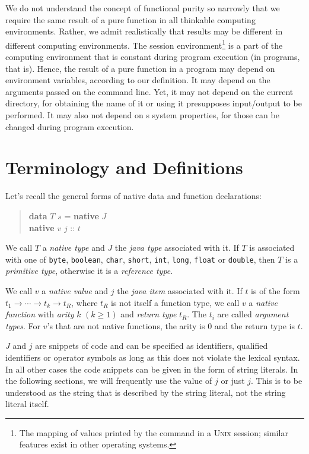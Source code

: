 \begin{description}
We do not understand the concept of functional purity so narrowly that we require the same result of a pure function in all thinkable computing environments. Rather, we admit realistically that results may be different in different computing environments. The session environment\footnote{The mapping of values printed by the command  in a \textsc{Unix} session; similar features exist in other operating systems.} is a part of the computing environment that is constant during program execution (in \java{} programs, that is). Hence, the result of a pure function in a program may depend on environment variables, according to our definition. It may depend on the arguments passed on the command line. Yet, it may not depend on the current directory, for obtaining the name of it or using it presupposes input/output to be performed. It may also not depend on \java{}s system properties, for those can be changed during program execution.
\end{description}

\section{Terminology and Definitions}

Let's recall the general forms of native data and function declarations:
\begin{quote}
\begin{flushleft}
\textbf{data} $T$ $s$ = \textbf{native} $J$\\
\textbf{native} $v$ $j$ :: $t$
\end{flushleft}
\end{quote}

We call $T$ a \emph{native type} and $J$ the \emph{java type} associated with it. If $T$ is associated with one of \texttt{byte}, \texttt{boolean}, \texttt{char}, \texttt{short}, \texttt{int}, \texttt{long}, \texttt{float} or \texttt{double}, then $T$ is a \emph{primitive type}, otherwise it is a  \emph{reference type}.

We call $v$ a \emph{native value} and $j$ the \emph{java item} associated with it. If $t$ is of the form $t_1 \rightarrow{} \cdots{} \rightarrow{} t_k \rightarrow{}t_R$, where $t_R$ is not itself a function type, we call $v$ a \emph{native function} with \emph{arity} $k$ $(k\ge 1)$ and \emph{return type} $t_R$. The $t_i$ are called \emph{argument types}. For $v$'s that are not native functions, the arity is 0 and the return type is $t$.

$J$ and $j$ are snippets of \java{} code and can be specified as identifiers, qualified identifiers or operator symbols as long as this does not violate the \frege{} lexical syntax. In all other cases the code snippets can be given in the form of string literals. In the following sections, we will frequently use the value of $j$ or just $j$. This is to be understood as the string that is described by the string literal, not the string literal itself.

